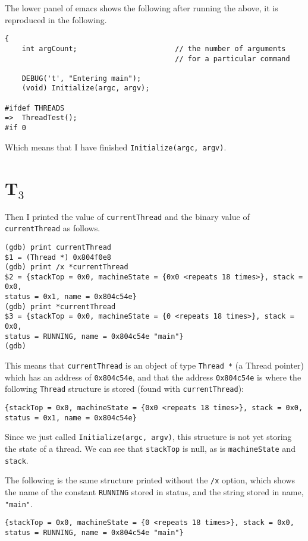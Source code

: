 \documentclass[letterpaper, 10pt]{article}
\begin{document}
	The lower panel of emacs shows the following after running the above, it is reproduced in the following.

	\begin{verbatim}
{
	int argCount;                       // the number of arguments
										// for a particular command

	DEBUG('t', "Entering main");
	(void) Initialize(argc, argv);

#ifdef THREADS
=>  ThreadTest();
#if 0
	\end{verbatim}

	Which means that I have finished {\tt Initialize(argc, argv)}.

	\section*{T$_3$}

	Then I printed the value of {\tt currentThread} and the binary value of {\tt *currentThread} as follows.

	\begin{verbatim}
(gdb) print currentThread
$1 = (Thread *) 0x804f0e8
(gdb) print /x *currentThread
$2 = {stackTop = 0x0, machineState = {0x0 <repeats 18 times>}, stack = 0x0,
status = 0x1, name = 0x804c54e}
(gdb) print *currentThread
$3 = {stackTop = 0x0, machineState = {0 <repeats 18 times>}, stack = 0x0,
status = RUNNING, name = 0x804c54e "main"}
(gdb)
	\end{verbatim}

	This means that {\tt currentThread} is an object of type {\tt Thread *} (a Thread pointer) which has an address of {\tt 0x804c54e}, and that the address {\tt 0x804c54e} is where the following {\tt Thread} structure is stored (found with {\tt *currentThread}):

	\begin{verbatim}
{stackTop = 0x0, machineState = {0x0 <repeats 18 times>}, stack = 0x0,
status = 0x1, name = 0x804c54e}
	\end{verbatim}

	Since we just called {\tt Initialize(argc, argv)}, this structure is not yet storing the state of a thread. We can see that {\tt stackTop} is null, as is {\tt machineState} and {\tt stack}.

	The following is the same structure printed without the {\tt /x} option, which shows the name of the constant {\tt RUNNING} stored in status, and the string stored in name, {\tt "main"}.

	\begin{verbatim}
{stackTop = 0x0, machineState = {0 <repeats 18 times>}, stack = 0x0,
status = RUNNING, name = 0x804c54e "main"}
	\end{verbatim}
\end{document}

